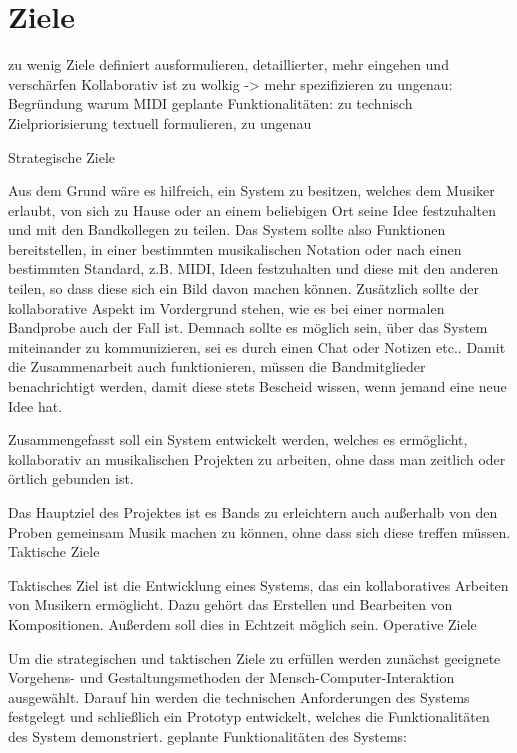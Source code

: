 \documentclass[12pt]{scrartcl}
\begin{document}

\section{Ziele}

zu wenig Ziele definiert
ausformulieren, detaillierter, mehr eingehen und verschärfen
Kollaborativ ist zu wolkig -> mehr spezifizieren
zu ungenau: Begründung warum MIDI
geplante Funktionalitäten: zu technisch
Zielpriorisierung textuell formulieren, zu ungenau

Strategische Ziele

Aus dem Grund wäre es hilfreich, ein System zu besitzen, welches dem Musiker erlaubt, von sich zu Hause oder an einem beliebigen Ort seine Idee festzuhalten und mit den Bandkollegen zu teilen. Das System sollte also Funktionen bereitstellen, in einer bestimmten musikalischen Notation oder nach einen bestimmten Standard, z.B. MIDI, Ideen festzuhalten und diese mit den anderen teilen, so dass diese sich ein Bild davon machen können. Zusätzlich sollte der kollaborative Aspekt im Vordergrund stehen, wie es bei einer normalen Bandprobe auch der Fall ist. Demnach sollte es möglich sein, über das System miteinander zu kommunizieren, sei es durch einen Chat oder Notizen etc.. Damit die Zusammenarbeit auch funktionieren, müssen die Bandmitglieder benachrichtigt werden, damit diese stets Bescheid wissen, wenn jemand eine neue Idee hat.

Zusammengefasst soll ein System entwickelt werden, welches es ermöglicht, kollaborativ an musikalischen Projekten zu arbeiten, ohne dass man zeitlich oder örtlich gebunden ist.


Das Hauptziel des Projektes ist es Bands zu erleichtern auch außerhalb von den Proben gemeinsam Musik machen zu können, ohne dass sich diese treffen müssen.
Taktische Ziele

Taktisches Ziel ist die Entwicklung eines Systems, das ein kollaboratives Arbeiten von Musikern ermöglicht. Dazu gehört das Erstellen und Bearbeiten von Kompositionen. Außerdem soll dies in Echtzeit möglich sein.
Operative Ziele

Um die strategischen und taktischen Ziele zu erfüllen werden zunächst geeignete Vorgehens- und Gestaltungsmethoden der Mensch-Computer-Interaktion ausgewählt. Darauf hin werden die technischen Anforderungen des Systems festgelegt und schließlich ein Prototyp entwickelt, welches die Funktionalitäten des System demonstriert.
geplante Funktionalitäten des Systems:
\end{document}
